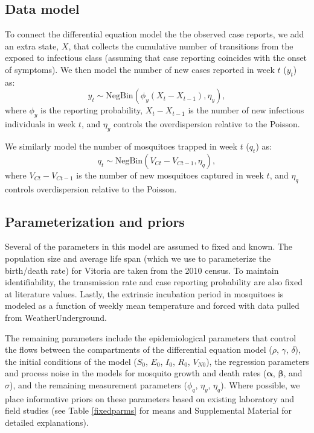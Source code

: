 \documentclass[10pt,letterpaper]{article}
\begin{document}
\subsection*{Data model}

To connect the differential equation model the the observed case reports, we add an extra state, $X$, that collects the cumulative number of transitions from the exposed to infectious class (assuming that case reporting coincides with the onset of symptoms).
We then model the number of new cases reported in week $t$ ($y_t$) as:
\begin{equation}
y_t  \sim \text{NegBin}(\phi_y (X_t - X_{t-1}), \eta_y),
\end{equation}
where $\phi_y$ is the reporting probability, $X_t - X_{t-1}$ is the number of new infectious individuals in week $t$, and $\eta_y$ controls the overdispersion relative to the Poisson.

We similarly model the number of mosquitoes trapped in week $t$ ($q_t$) as:
\begin{equation}
q_t \sim \text{NegBin}(V_{Ct} - V_{Ct-1}, \eta_q),
\end{equation}
where $V_{Ct} - V_{Ct-1}$ is the number of new mosquitoes captured in week $t$, and $\eta_q$ controls overdispersion relative to the Poisson.

\subsection*{Parameterization and priors}

Several of the parameters in this model are assumed to fixed and known. 
The population size and average life span (which we use to parameterize the birth/death rate) for Vitoria are taken from the 2010 census.
To maintain identifiability, the transmission rate and case reporting probability are also fixed at literature values.
Lastly, the extrinsic incubation period in mosquitoes is modeled as a function of weekly mean temperature and forced with data pulled from WeatherUnderground.

The remaining parameters include the epidemiological parameters that control the flows between the compartments of the differential equation model ($\rho$, $\gamma$, $\delta$), the initial conditions of the model ($S_0$, $E_0$, $I_0$, $R_0$, $V_{N0}$), the regression parameters and process noise in the models for mosquito growth and death rates ($\mathbf{\alpha}$, $\mathbf{\beta}$, and $\sigma$), and the remaining measurement parameters ($\phi_q$, $\eta_y$, $\eta_q$).  
Where possible, we place informative priors on these parameters based on existing laboratory and field studies (see Table \ref{fixedparms} for means and Supplemental Material for detailed explanations).
\end{document}
